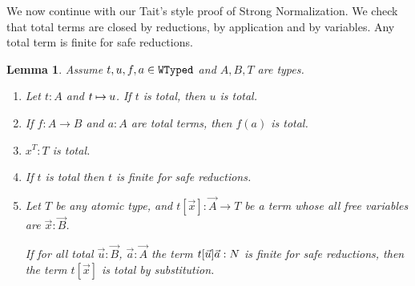 \documentclass{article}
\newtheorem{lemma}[theorem]{Lemma}
\begin{document}
We now continue with our Tait's style proof of Strong Normalization.
We check that total terms are closed by reductions, by application and by variables.
Any total term is finite for safe reductions.




\begin{lemma}\label{lem:total_value-finiteness}
Assume $t,u,f,a \in {\tt WTyped}$ and $A,B,T$ are types.

  \begin{enumerate}
  \item
\label{lem:total_value-finiteness1}
    Let $t:A$ and $t \mathbin{\mapsto} u$.
    If $t$ is total, then $u$ is total.

  \item
\label{lem:total_value-finiteness2}
    If $f:A \rightarrow B$ and $a:A$ are total terms, then $f(a)$ is total.

  \item
\label{lem:total_value-finiteness2bis}
    $x^T:T$ is total.

 \item
\label{lem:total_value-finiteness2ter}
  If $t$ is total then $t$ is finite for safe reductions.

  \item
\label{lem:total_value-finiteness3}
    Let $T$ be any atomic type, and $t[\vec{x}]:\vec{A}\rightarrow T$ be a term
    whose all free variables are $\vec{x}:\vec{B}$.

    If for all total $\vec{u}:\vec{B}$, $\vec{a}:\vec{A}$ the term 
    $t[\vec{u}]\vec{a}:{N}$ is \emph{finite for safe reductions}, then
    the term $t[\vec{x}]$ is \emph{total by substitution}.
  \end{enumerate}

\end{lemma}
\end{document}
